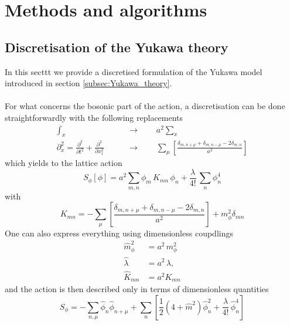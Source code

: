 
\chapter{Methods and algorithms}
\label{chapt:methods}

\section{Discretisation of the Yukawa theory}
\label{sec:lattice_discretisation}

In this secttt we provide a discretised formulation of the Yukawa model introduced in section \ref{subsec:Yukawa_theory}. \\~\\
For what concerns the bosonic part of the action, a discretisation can be done straightforwardly with the following replacements
\begin{equation*}
    \begin{aligned}
        \int_x \qquad &\to \qquad a^2 \sum_x \\
        \partial^2_x = \frac{\partial^2}{\partial t^2} + \frac{\partial^2}{\partial x_1^2} \qquad &\to \qquad \sum_\mu \left[\frac{\delta_{m,n+\mu} + \delta_{m,n-\mu} - 2 \delta_{m,n}}{a^2}\right]
    \end{aligned}
\end{equation*}
which yields to the lattice action
\begin{equation*}
        S_\phi [\phi] =  a^2 \sum_{m,n} \phi_m \, K_{mn} \, \phi_n + \frac{\lambda}{4!} \, \sum_n \phi_n^4 
\end{equation*}
with 
\begin{equation*}
    K_{mn} = - \sum_\mu \left[\frac{\delta_{m,n+\mu} + \delta_{m,n-\mu} - 2 \delta_{m,n}}{a^2}\right] + m_\phi^2 \delta_{mn} 
\end{equation*}
One can also express everything using dimensionless coupdlings
\begin{equation}
    \begin{aligned}
        \hat m_\phi^2 &= a^2 \, m_\phi^2 \\
        \hat \lambda &= a^{2} \, \lambda, \\
        \hat K_{mn} &= a^2 K_{mn}
    \end{aligned}
    \label{eq:couplings_redefitinion}
\end{equation}
and the action is then described only in terms of dimensionless quantities
\begin{equation*}
    S_\phi=-\sum_{n, \mu} \hat\phi_n \hat\phi_{n+\mu}+\sum_n\left[\frac{1}{2}\left(4+\hat m^2\right) \hat\phi_n^2 +\frac{\hat\lambda}{4 !} \, \hat\phi_n^4\right]
\end{equation*}
